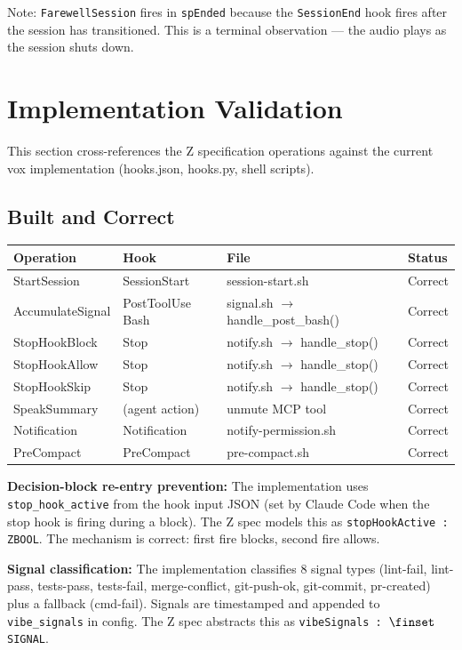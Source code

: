 \documentclass[a4paper,10pt,fleqn]{article}
\begin{document}
Note: \texttt{FarewellSession} fires in \texttt{spEnded} because the
\texttt{SessionEnd} hook fires after the session has transitioned.
This is a terminal observation --- the audio plays as the session
shuts down.

\section{Implementation Validation}

This section cross-references the Z specification operations against
the current vox implementation (hooks.json, hooks.py, shell scripts).

\subsection{Built and Correct}

\begin{tabular}{llll}
\hline
\textbf{Operation} & \textbf{Hook} & \textbf{File} & \textbf{Status} \\
\hline
StartSession & SessionStart & session-start.sh & Correct \\
AccumulateSignal & PostToolUse Bash & signal.sh $\to$ handle\_post\_bash() & Correct \\
StopHookBlock & Stop & notify.sh $\to$ handle\_stop() & Correct \\
StopHookAllow & Stop & notify.sh $\to$ handle\_stop() & Correct \\
StopHookSkip & Stop & notify.sh $\to$ handle\_stop() & Correct \\
SpeakSummary & (agent action) & unmute MCP tool & Correct \\
Notification & Notification & notify-permission.sh & Correct \\
PreCompact & PreCompact & pre-compact.sh & Correct \\
\hline
\end{tabular}

\textbf{Decision-block re-entry prevention:} The implementation uses
\texttt{stop\_hook\_active} from the hook input JSON (set by Claude Code
when the stop hook is firing during a block). The Z spec models this as
\texttt{stopHookActive : ZBOOL}. The mechanism is correct: first fire
blocks, second fire allows.

\textbf{Signal classification:} The implementation classifies 8 signal
types (lint-fail, lint-pass, tests-pass, tests-fail, merge-conflict,
git-push-ok, git-commit, pr-created) plus a fallback (cmd-fail). Signals
are timestamped and appended to \texttt{vibe\_signals} in config. The Z
spec abstracts this as \texttt{vibeSignals : $\finset$ SIGNAL}.
\end{document}

